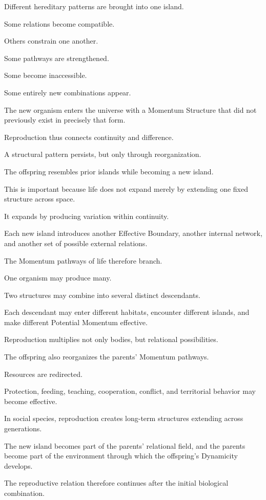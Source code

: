 Different hereditary patterns are brought into one island.

Some relations become compatible.

Others constrain one another.

Some pathways are strengthened.

Some become inaccessible.

Some entirely new combinations appear.

The new organism enters the universe with a Momentum Structure that did not previously exist in precisely that form.

Reproduction thus connects continuity and difference.

A structural pattern persists, but only through reorganization.

The offspring resembles prior islands while becoming a new island.

This is important because life does not expand merely by extending one fixed structure across space.

It expands by producing variation within continuity.

Each new island introduces another Effective Boundary, another internal network, and another set of possible external relations.

The Momentum pathways of life therefore branch.

One organism may produce many.

Two structures may combine into several distinct descendants.

Each descendant may enter different habitats, encounter different islands, and make different Potential Momentum effective.

Reproduction multiplies not only bodies, but relational possibilities.

The offspring also reorganizes the parents’ Momentum pathways.

Resources are redirected.

Protection, feeding, teaching, cooperation, conflict, and territorial behavior may become effective.

In social species, reproduction creates long-term structures extending across generations.

The new island becomes part of the parents’ relational field, and the parents become part of the environment through which the offspring’s Dynamicity develops.

The reproductive relation therefore continues after the initial biological combination.

